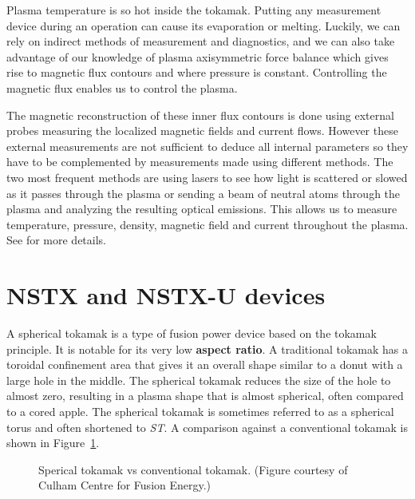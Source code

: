 \documentclass[12pt,lot, lof]{puthesis}
\begin{document}
Plasma temperature is so hot inside the tokamak. Putting any measurement device during an operation can cause its evaporation or melting.
Luckily, we can rely on indirect methods of measurement and diagnostics, and we can also take advantage of our knowledge of plasma axisymmetric force balance which gives rise to magnetic flux contours and where pressure is constant. Controlling  the magnetic flux enables us to control the plasma.

The magnetic reconstruction of these inner flux contours is done using external probes measuring the localized magnetic fields and current flows. However these external measurements are not sufficient to deduce all internal parameters so they have to be complemented by measurements made using different methods. The two most frequent methods are using lasers to see how light is scattered or slowed as it passes through the plasma or sending a beam of neutral atoms through the plasma and analyzing the resulting optical emissions.
This allows us to measure temperature, pressure, density, magnetic field and current throughout the plasma. See \cite{Equipe78, Orlinskij88, Matthews94, McKee99, Hutchinson02} for more details.

\section{NSTX and NSTX-U devices}

A spherical tokamak is a type of fusion power device based on the tokamak principle. It is notable for its very low \textbf{aspect ratio}. A traditional tokamak has a toroidal confinement area that gives it an overall shape similar to a donut with a large hole in the middle. The spherical tokamak reduces the size of the hole to almost zero, resulting in a plasma shape that is almost spherical, often compared to a cored apple. The spherical tokamak is sometimes referred to as a spherical torus and often shortened to \emph{ST}. A comparison against a conventional tokamak is shown in Figure~\ref{nstx1}.

\begin{figure}[htbp]
	\centering
	\caption{Sperical tokamak vs conventional tokamak. (Figure courtesy of Culham Centre for Fusion Energy.)}
	\label{nstx1}
\end{figure}
\end{document}
